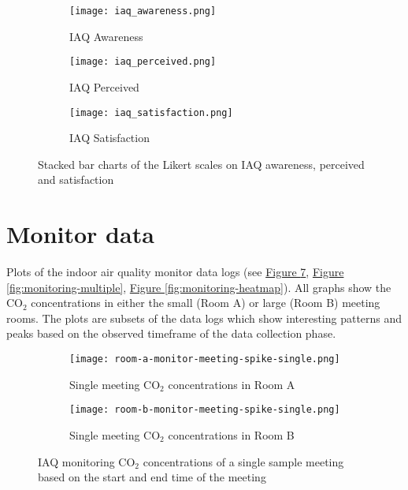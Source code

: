 \begin{appendices}
\begin{figure}[htbp]
    \centering
    \begin{subfigure}{0.18\textwidth}
        \centering
        \texttt{[image: iaq\_awareness.png]}
        \caption{IAQ Awareness}
        \label{fig:survey-awareness}
    \end{subfigure}
    \hfill
    \begin{subfigure}{0.18\textwidth}
        \centering
        \texttt{[image: iaq\_perceived.png]}
        \caption{IAQ Perceived}
        \label{fig:survey-perceived}
    \end{subfigure}
    \hfill
    \begin{subfigure}{0.18\textwidth}
        \centering
        \texttt{[image: iaq\_satisfaction.png]}
        \caption{IAQ Satisfaction}
        \label{fig:survey-satisfaction}
    \end{subfigure}    
    \caption{Stacked bar charts of the Likert scales on IAQ awareness, perceived and satisfaction}
    \label{fig:survey-stacked-bars}
\end{figure}

\newpage

\section{Monitor data}
\label{appendix:monitor-data}

Plots of the indoor air quality monitor data logs (see \hyperref[fig:monitoring-single]{Figure \ref{fig:monitoring-single}}, \hyperref[fig:monitoring-multiple]{Figure \ref{fig:monitoring-multiple}}, \hyperref[fig:monitoring-heatmap]{Figure \ref{fig:monitoring-heatmap}}). All graphs show the CO$_{2}$ concentrations in either the small (Room A) or large (Room B) meeting rooms. The plots are subsets of the data logs which show interesting patterns and peaks based on the observed timeframe of the data collection phase.

\begin{figure}[htbp]
    \centering
    \begin{subfigure}{0.46\textwidth}
        \centering
        \texttt{[image: room-a-monitor-meeting-spike-single.png]}
        \caption{Single meeting CO$_{2}$ concentrations in Room A}
        \label{fig:monitor-single-a}
    \end{subfigure}
    \hfill
    \begin{subfigure}{0.46\textwidth}
        \centering
        \texttt{[image: room-b-monitor-meeting-spike-single.png]}
        \caption{Single meeting CO$_{2}$ concentrations in Room B}
        \label{fig:monitor-single-b}
    \end{subfigure}
    \caption{IAQ monitoring CO$_{2}$ concentrations of a single sample meeting based on the start and end time of the meeting}
    \label{fig:monitoring-single}
\end{figure}


\end{appendices}
